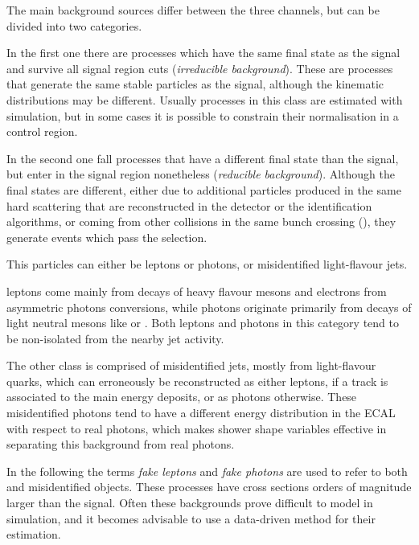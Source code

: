 \label{sec:backgrounds}
The main background sources differ between the three channels, but can be divided into two categories.

In the first one there are processes which have the same final state as the signal and survive all signal region cuts (\textit{irreducible background}).
These are processes that generate the same stable particles as the signal,
although the kinematic distributions may be different.
Usually processes in this class are estimated with simulation,
but in some cases it is possible to constrain their normalisation in a control region.

In the second one fall processes that have a different final state than the signal, but enter in the signal region nonetheless (\textit{reducible background}).
Although the final states are different,
either due to additional particles produced in the same hard scattering
that are reconstructed in the detector or the identification algorithms,
or coming from other collisions in the same bunch crossing (\pileup),
they generate events which pass the selection.

This particles can either be \nonprompt leptons or photons, or misidentified light-flavour jets.

\Nonprompt leptons come mainly from decays of heavy flavour mesons and electrons from asymmetric photons conversions,
while \nonprompt photons originate primarily from decays of light neutral mesons like \PGpz or \PGh.
Both leptons and photons in this category tend to be non-isolated from the nearby jet activity.

The other class is comprised of misidentified jets, mostly from light-flavour quarks, which can erroneously be reconstructed as either leptons,
if a track is associated to the main energy deposits, or as photons otherwise.
These misidentified photons tend to have a different energy distribution in the ECAL with respect to real photons,
which makes shower shape variables effective in separating this background from real photons.

In the following the terms \textit{fake leptons} and \textit{fake photons} are used to refer to both \nonprompt and misidentified objects.
These processes have cross sections orders of magnitude larger than the signal.
Often these backgrounds prove difficult to model in simulation,
and it becomes advisable to use a data-driven method for their estimation.

